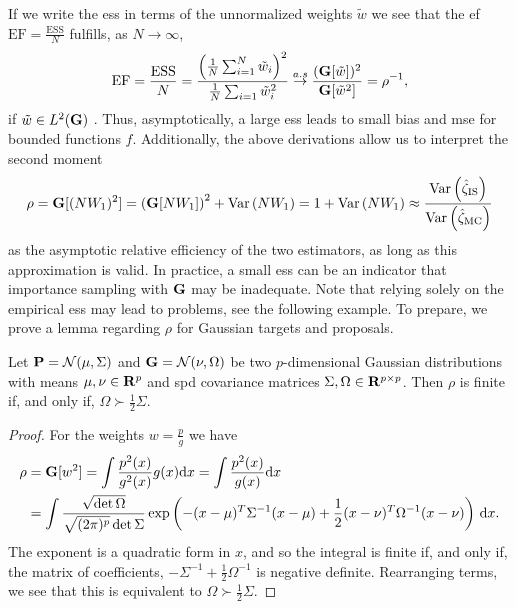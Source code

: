 If we write the \acrshort{ess} in terms of the unnormalized weights $\tilde w$ we see that the \gls{ef} $\text{EF} = \frac{\text{ESS}}{N}$ fulfills, as $N\to\infty$,
\begin{align}
\label{eq:efficency_factor}
\text{EF} = \frac{\text{ESS}}{N} = \frac{\left(\frac{1}{N}\sum_{i = 1}^{N} \tilde w_{i}\right)^{2}}{\frac{1}{N}\sum_{i = 1} \tilde w_{i}^2} \stackrel{a.s}{\to} \frac{(\G [\tilde w])^{2}}{\G [\tilde w^{2}]} = \rho^{-1},
\end{align}
if $\tilde w \in L^{2}(\G)$ \citep[Section 2.3.2]{Agapiou2017Importance}. Thus, asymptotically, a large \acrshort{ess} leads to small bias and \acrshort{mse} for bounded functions $f$. Additionally, the above derivations allow us to interpret the second moment
$$
\rho = \G [(NW_1)^2] = \left(\G [NW_1]\right)^{2} + \var \left( NW_1 \right) = 1 + \var \left(NW_1\right) \approx \frac{\var \left(\hat\zeta_{\text{IS}}\right)}{\var \left(\hat\zeta_{\text{MC}}\right)}
$$
as the asymptotic relative efficiency of the two estimators, as long as this approximation is valid. In practice, a small \acrshort{ess} can be an indicator that importance sampling with $\G$ may be inadequate. Note that relying solely on the empirical \acrshort{ess} may lead to problems, see the following example. To prepare, we prove a lemma regarding $\rho$ for Gaussian targets and proposals.

\begin{lemma}
    \label{lem:gaussian_proposal_factor_2}
    Let $\P = \mathcal N(\mu, \Sigma)$ and $\G = \mathcal N(\nu, \Omega)$ be two $p$-dimensional Gaussian distributions with means $\mu,\nu \in \R^{p}$ and \acrshort{spd} covariance matrices $\Sigma,\Omega \in \R^{p\times p}$. 
    Then $\rho$ is finite if, and only if, $\Omega \succ \frac{1}{2} \Sigma$. 
\end{lemma}

\begin{proof}
    For the weights $w = \frac{p}{g}$ we have
    \begin{align*}
        \rho &= \G [w^{2}] = \int \frac{p^{2}(x)}{g^{2}(x)} g(x) \mathrm d x = \int \frac{p^{2}(x)}{g(x)} \mathrm d x \\
        &= \int \frac{\sqrt{\det \Omega}}{\sqrt{(2\pi)^{p}}\det \Sigma} \exp \left( -(x - \mu)^{T}\Sigma^{-1}(x - \mu) + \frac{1}{2}(x - \nu)^{T}\Omega^{-1}(x - \nu)\right) \d x. 
    \end{align*}
    The exponent is a quadratic form in $x$, and so the integral is finite if, and only if, the matrix of coefficients, $-\Sigma^{-1} + \frac{1}{2}\Omega^{-1}$ is negative definite. Rearranging terms, we see that this is equivalent to $\Omega \succ \frac{1}{2}\Sigma$.
\end{proof}


